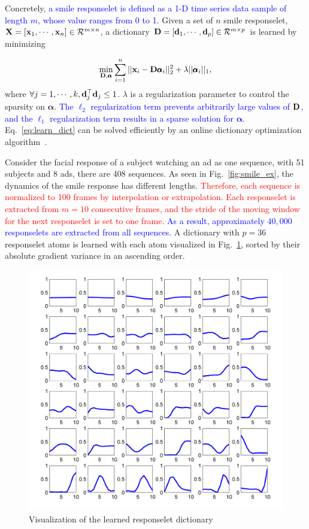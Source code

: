 \documentclass[twoside,leqno,twocolumn]{article}
\newcommand{\Songfan}[1]{\textcolor{red}{#1}}
\newcommand{\SFAdd}[1]{\textcolor{blue}{#1}}
\begin{document}
Concretely, \SFAdd{a smile responselet is defined as a 1-D time series data sample of length $m$, whose value ranges from 0 to 1.} Given a set of $n$ smile responselet, ${\bf X}=[{\bf x}_1, \cdots, {\bf x}_n]\in \mathcal{R}^{m\times n}$, a dictionary ${\bf D}=[{\bf d}_1,\cdots,{\bf d}_p] \in \mathcal{R}^{m\times p}$ is learned by minimizing

\begin{align}
\label{eq:learn_dict}
\min_{{\bf D} , \pmb\alpha} \sum_{i=1}^n ||{\bf x}_i-{\bf D} \pmb\alpha_i||^2_2 +\lambda ||\pmb\alpha_i||_1,
\end{align}
where $\forall j=1,\cdots,k, {\bf d}^\top_j {\bf d}_j \leq 1$. $\lambda$ is a regularization parameter to control the sparsity on $\pmb\alpha$. \SFAdd{The $\ell_2$ regularization term prevents arbitrarily large values of ${\bf D}$, and the $\ell_1$ regularization term results in a sparse solution for $\pmb\alpha$.} Eq.~\eqref{eq:learn_dict} can be solved efficiently by an online dictionary optimization algorithm~\cite{spams}. 

Consider the facial response of a subject watching an ad as one sequence, with 51 subjects and 8 ads, there are 408 sequences. As seen in Fig.~\ref{fig:smile_ex}, the dynamics of the smile response has different lengths. \Songfan{Therefore, each sequence is normalized to 100 frames by interpolation or extrapolation. Each responselet is extracted from $m=10$ consecutive frames, and the stride of the moving window for the next responselet is set to one frame.} \SFAdd{As a result, approximately $40,000$ responselets are extracted from all sequences.} A dictionary with $p=36$ responselet atoms is learned with each atom visualized in Fig.~\ref{fig:dict}, sorted by their absolute gradient variance in an ascending order. 

\begin{figure}[!t]
	\centering
		\includegraphics[width=\columnwidth]{fig/dict.png}
	\caption{Visualization of the learned responselet dictionary}
	\label{fig:dict}
\end{figure}
\end{document}
